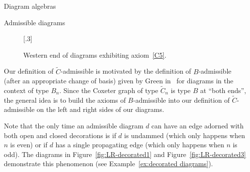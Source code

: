 \documentclass[11pt]{amsart}
\theoremstyle{definition}
\numberwithin{equation}{section}
\newcommand{\C}{\widetilde{C}}
\newcommand{\x}{\mathsf{x}}
\renewcommand{\(}{\left(}
\renewcommand{\)}{\right)}
\begin{document}
\begin{section}{Diagram algebras}
\begin{subsection}{Admissible diagrams}
\begin{figure}[!ht]
{
}
\subcaptionbox{\label{fig:western C5e}}[.3\linewidth]{
}
\caption{Western end of diagrams exhibiting axiom~\ref{C5}.}\label{fig:western C5}
\end{figure}

Our definition of $\C$-admissible is motivated by the definition of $B$-admissible (after an appropriate change of basis) given by Green in~\cite[Definition 2.2.4]{Green2001} for diagrams in the context of type $B_n$.  Since the Coxeter graph of type $\C_n$ is type $B$ at ``both ends'', the general idea is to build the axioms of $B$-admissible into our definition of $\C$-admissible on the left and right sides of our diagrams.

Note that the only time an admissible diagram $d$ can have an edge adorned with both open and closed decorations is if $d$ is undammed (which only happens when $n$ is even) or if $d$ has a single propagating edge (which only happens when $n$ is odd).  The diagrams in Figure~\ref{fig:LR-decorated1} and Figure~\ref{fig:LR-decorated3} demonstrate this phenomenon (see Example~\ref{ex:decorated diagrams}).


\end{subsection}
\end{section}
\end{document}

